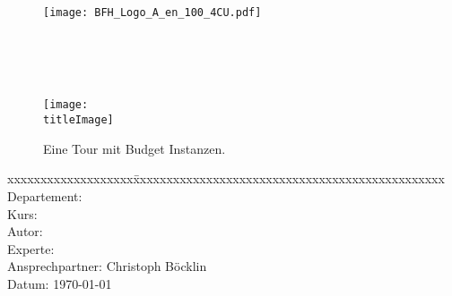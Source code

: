\thispagestyle{empty}

\begin{figure}
	\texttt{[image: BFH\_Logo\_A\_en\_100\_4CU.pdf]}
\end{figure}


\begin{minipage}[c][3cm][c]{\linewidth} {
	\centering
	\vspace*{2cm}
	{\fontsize{24pt}{0pt}\selectfont \textbf{\doctitle}}  \\
	\vspace*{0.6cm}
	{\fontsize{20pt}{0pt}\selectfont {Geodatenverarbeitung\\ mit Budget Instanzen}}  \\
	\vspace*{1cm}
	{\fontsize{14pt}{0pt}\selectfont \doctype}  \\
}
\end{minipage}


\vspace{1.5cm}


\begin{figure}[H]
	\centering
	\makebox[0.9\linewidth]{\color{BFHGray} \rule{0.9\linewidth}{10pt}}
	\texttt{[image: \\titleImage]}
	\makebox[0.9\linewidth]{\color{BFHGray} \rule{0.9\linewidth}{10pt}}
    \caption{Eine Tour mit Budget Instanzen\space\cite{HippieCar:1}.}
\end{figure}

\vfill

\begin{minipage}[c][3cm][c]{\linewidth}
{
	\centering
	\begin{tabbing}
		xxxxxxxxxxxxxxxxxxx\=xxxxxxxxxxxxxxxxxxxxxxxxxxxxxxxxxxxxxxxxxxxxxxx \kill
		Departement:	\> \fieldofstudies \\
		Kurs:			\> \course \\
		Autor:		\> \docauthor \\%
		Experte:		\> \prof \\
		Ansprechpartner:      \> Christoph Böcklin \\
		Datum:			\> \today \\
	\end{tabbing}
}
\end{minipage}

\pagebreak
